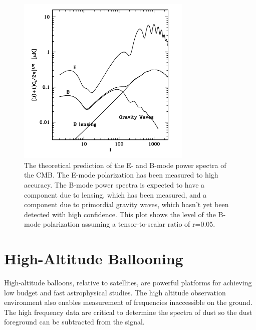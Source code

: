 \begin{figure}[htbp]
\begin{center}
\includegraphics[height=3.2in]{figures/predicted_power_spectra.png}
\caption[CMB power spectra]{The theoretical prediction of the E- and B-mode power spectra of the \ac{CMB}. The E-mode polarization has been measured to high accuracy. The B-mode power spectra is expected to have a component due to lensing, which has been measured, and a component due to primordial gravity waves, which hasn't yet been detected with high confidence. This plot shows the level of the B-mode polarization assuming a tensor-to-scalar ratio of r=0.05. 
\label{fig:cmb_spectra} }
\end{center}
\end{figure}




\section{High-Altitude Ballooning}
\label{sec:balloons}


High-altitude balloons, relative to satellites, are powerful platforms for achieving low budget and fast astrophysical studies. 
The high altitude observation environment also enables measurement of frequencies inaccessible on the ground. 
The high frequency data are critical to determine the spectra of dust so the dust foreground can be subtracted from the signal. 

